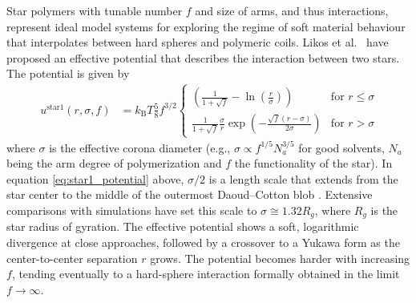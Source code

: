 Star polymers with tunable number $f$ and size of arms, and thus interactions,
represent ideal model systems for exploring the regime of soft material behaviour that
interpolates between hard spheres and polymeric coils.
Likos et al.\ \cite{Likos1998,Likos2001} have proposed an effective potential that describes
the interaction between two stars. The potential is given by
\begin{align}\
\label{eq:star1_potential}
u^\text{star1}(r,\sigma,f) &=
k_\text{B} T \frac{5}{8} f^{3/2}
\begin{cases}
\left(\frac{1}{1+\sqrt{f}}-\ln\left(\frac{r}{\sigma}\right) \right)
          & \mbox{for } r \leq \sigma \\
\frac{1}{1+\sqrt{f}} \frac{\sigma}{r}
\exp\left(-\frac{\sqrt{f} (r-\sigma)}{2\sigma}\right)
          & \mbox{for } r >    \sigma
\end{cases}
\end{align}
where $\sigma$ is the effective corona diameter
(e.g., $\sigma \propto f^{1/5} N_a^{3/5}$ for good
solvents, $N_a$ being the arm degree of polymerization and $f$ the functionality of the star).
In equation \ref{eq:star1_potential} above, $\sigma/2$ is a length scale that extends from the
star center to the middle of the outermost Daoud–Cotton
blob \cite{Likos2006}. Extensive comparisons with simulations have
set this scale to $\sigma \cong 1.32R_g$, where $R_g$ is the star radius of
gyration. The effective potential shows a soft, logarithmic
divergence at close approaches, followed by a crossover to a
Yukawa form as the center-to-center separation $r$ grows. The
potential becomes harder with increasing $f$, tending eventually to a hard-sphere
interaction formally obtained in the limit $f\rightarrow\infty$.

